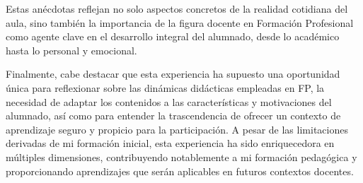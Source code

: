 Estas anécdotas reflejan no solo aspectos concretos de la realidad cotidiana del aula, sino también la importancia de la figura docente en Formación Profesional como agente clave en el desarrollo integral del alumnado, desde lo académico hasta lo personal y emocional.

Finalmente, cabe destacar que esta experiencia ha supuesto una oportunidad única para reflexionar sobre las dinámicas didácticas empleadas en FP, la necesidad de adaptar los contenidos a las características y motivaciones del alumnado, así como para entender la trascendencia de ofrecer un contexto de aprendizaje seguro y propicio para la participación. A pesar de las limitaciones derivadas de mi formación inicial, esta experiencia ha sido enriquecedora en múltiples dimensiones, contribuyendo notablemente a mi formación pedagógica y proporcionando aprendizajes que serán aplicables en futuros contextos docentes.
